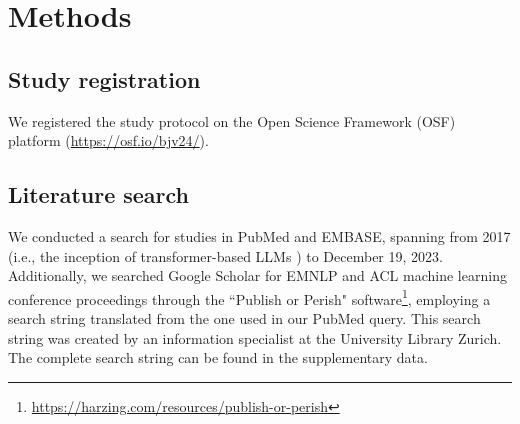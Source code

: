 \documentclass[fleqn,10pt]{olplainarticle}
\begin{document}





\section*{Methods}
\subsection*{Study registration}
We registered the study protocol on the Open Science Framework (OSF) platform (\url{https://osf.io/bjv24/}).

\subsection*{Literature search}
We conducted a search for studies in PubMed and EMBASE, spanning from 2017 (i.e., the inception of transformer-based LLMs \citep{vaswani2017attention}) to December 19, 2023. Additionally, we searched Google Scholar for EMNLP and ACL machine learning conference proceedings through the ``Publish or Perish" software\footnote{\url{https://harzing.com/resources/publish-or-perish}}, employing a search string translated from the one used in our PubMed query. This search string was created by an information specialist at the University Library Zurich. The complete search string can be found in the supplementary data.
\end{document}
